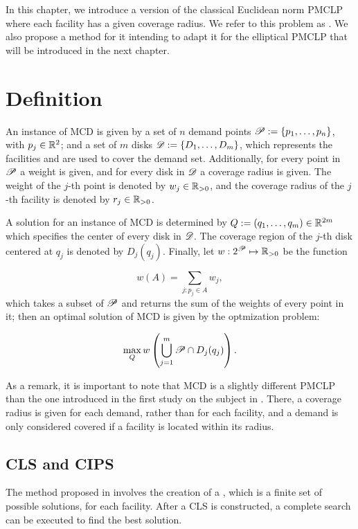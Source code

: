 In this chapter, we introduce a version of the classical Euclidean norm PMCLP where each facility has a given coverage radius. 
We refer to this problem as . We also propose a method for it intending to adapt it for the elliptical PMCLP that will be introduced in the next chapter. 

\section{Definition}

An instance of MCD is given by a set of $n$ demand points $\mathscr{P}:=\{p_1, \dots, p_n\}$, with $p_j\in\mathbb{R}^2$; and a set of $m$ disks $\mathscr{D}:=\{D_1, \dots, D_m\}$, which represents the facilities and are used to cover the demand set. Additionally, for every point in $\mathscr{P}$ a weight is given, and for every disk in $\mathscr{D}$ a coverage radius is given. The weight of the $j$-th point is denoted by $w_j\in\mathbb{R}_{>0}$, and the coverage radius of the $j$-th facility is denoted by $r_j \in \mathbb{R}_{>0}$.

A solution for an instance of MCD is determined by $Q:=(q_1, \dots, q_m) \in \mathbb{R}^{2m}$ which specifies the center of every disk in $\mathscr{D}$.
The coverage region of the $j$-th disk centered at $q_j$ is denoted by $D_j(q_j)$. Finally, let $w : 2^{\mathscr{P}} \mapsto \mathbb{R}_{>0}$ be the function

\begin{equation}
w(A) = \sum_{j : p_j \in A} w_j,
\end{equation}
which takes a subset of $\mathscr{P}$ and returns the sum of the weights of every point in it; then an optimal solution of MCD is given by the optmization problem:

\begin{equation}
\max_{Q} w\left(\bigcup_{j=1}^m \mathscr{P} \cap D_j(q_j)\right).
\end{equation}

As a remark, it is important to note that MCD is a slightly different PMCLP than the one introduced in the first study on the subject in . There, a coverage radius is given for each demand, rather than for each facility, and a demand is only considered covered if a facility is located within its radius. 

\subsection{CLS and CIPS}

The method proposed in  involves the creation of a , which is a finite set of possible solutions, for each facility. After a CLS is constructed, a complete search can be executed to find the best solution.

